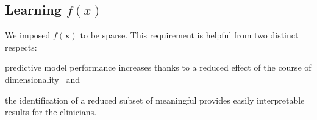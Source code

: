 \subsection{Learning $f(x)$} \label{sec:learning_f}


We imposed $f(\bm{x})$ to be sparse. This requirement is helpful from two distinct respects:
\begin{enumerate*}[label=(\roman*)]
	\item predictive model performance increases thanks to a reduced effect of the course of dimensionality~\cite{hastie2015statistical} and
	\item the identification of a reduced subset of meaningful \PCOs provides easily interpretable results for the clinicians.
\end{enumerate*}

